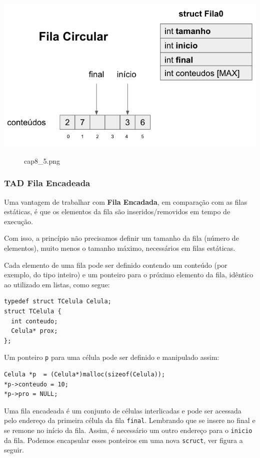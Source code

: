 \documentclass[12pt,a4paper]{article}
\begin{document}
\includegraphics{"figs/cap8_5.png"}

    \begin{figure}
\centering
\caption{cap8\_5.png}
\end{figure}

    \hypertarget{tad-fila-encadeada}{%
\subsubsection{TAD Fila Encadeada}\label{tad-fila-encadeada}}

    Uma vantagem de trabalhar com \textbf{Fila Encadada}, em comparação com
as filas estáticas, é que os elementos da fila são inseridos/removidos
em tempo de execução.

Com isso, a princípio não precisamos definir um tamanho da fila (número
de elementos), muito menos o tamanho máximo, necessários em filas
estáticas.

Cada elemento de uma fila pode ser definido contendo um conteúdo (por
exemplo, do tipo inteiro) e um ponteiro para o próximo elemento da fila,
idêntico ao utilizado em listas, como segue:

\begin{verbatim}
typedef struct TCelula Celula;
struct TCelula {
  int conteudo;
  Celula* prox;
};
\end{verbatim}

Um ponteiro \texttt{p} para uma célula pode ser definido e manipulado
assim:

\begin{verbatim}
Celula *p  = (Celula*)malloc(sizeof(Celula));
*p->conteudo = 10;
*p->pro = NULL;
\end{verbatim}

Uma fila encadeada é um conjunto de células interlicadas e pode ser
acessada pelo endereço da primeira célula da fila \texttt{final}.
Lembrando que se insere no final e se remone no início da fila. Assim, é
necessário um outro endereço para o \texttt{inicio} da fila. Podemos
encapsular esses ponteiros em uma nova \texttt{scruct}, ver figura a
seguir.
\end{document}
